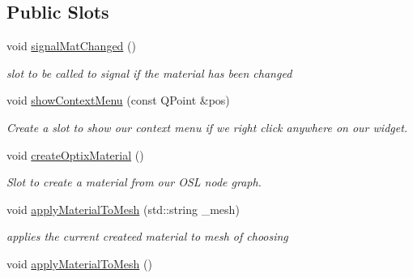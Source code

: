 \subsection*{Public Slots}
\begin{DoxyCompactItemize}
\item 
\hypertarget{class_abstract_material_widget_a1443013bf1f4b913b8d69d10eeaca186}{void \hyperlink{class_abstract_material_widget_a1443013bf1f4b913b8d69d10eeaca186}{signal\-Mat\-Changed} ()}\label{class_abstract_material_widget_a1443013bf1f4b913b8d69d10eeaca186}

\begin{DoxyCompactList}\small\item\em slot to be called to signal if the material has been changed \end{DoxyCompactList}\item 
\hypertarget{class_abstract_material_widget_a5ef500ae0f272d97fb4687ac0c6fd114}{void \hyperlink{class_abstract_material_widget_a5ef500ae0f272d97fb4687ac0c6fd114}{show\-Context\-Menu} (const Q\-Point \&pos)}\label{class_abstract_material_widget_a5ef500ae0f272d97fb4687ac0c6fd114}

\begin{DoxyCompactList}\small\item\em Create a slot to show our context menu if we right click anywhere on our widget. \end{DoxyCompactList}\item 
\hypertarget{class_abstract_material_widget_aae96067fbd8e7c2cdd686688bc25c3fd}{void \hyperlink{class_abstract_material_widget_aae96067fbd8e7c2cdd686688bc25c3fd}{create\-Optix\-Material} ()}\label{class_abstract_material_widget_aae96067fbd8e7c2cdd686688bc25c3fd}

\begin{DoxyCompactList}\small\item\em Slot to create a material from our O\-S\-L node graph. \end{DoxyCompactList}\item 
void \hyperlink{class_abstract_material_widget_a7085b0419e52157f46312928d9bfc326}{apply\-Material\-To\-Mesh} (std\-::string \-\_\-mesh)
\begin{DoxyCompactList}\small\item\em applies the current createed material to mesh of choosing \end{DoxyCompactList}\item 
\hypertarget{class_abstract_material_widget_a02cc4a4c8e489854363c646cd67c03f7}{void \hyperlink{class_abstract_material_widget_a02cc4a4c8e489854363c646cd67c03f7}{apply\-Material\-To\-Mesh} ()}\label{class_abstract_material_widget_a02cc4a4c8e489854363c646cd67c03f7}


\end{DoxyCompactItemize}
